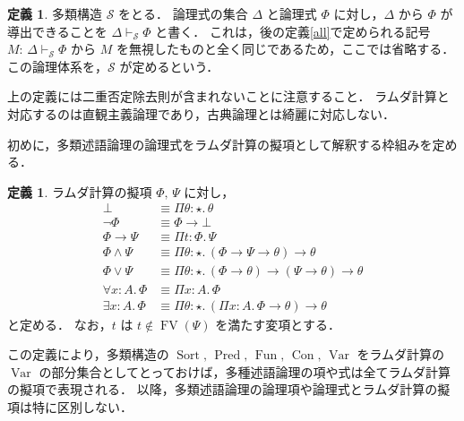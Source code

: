 \documentclass[./main]{subfiles}
\newcommand{\bto}{\mathbin{\to}}
\newcommand{\cl}{\mathpunct{:}}
\newcommand{\ocl}{\mathord{:}}
\newcommand{\op}[1]{\mathop{\mathrm{#1}}\nolimits}
\newcommand{\typstar}{\mathord{\star}}
\newcommand{\textem}[1]{\textbf{\textgt{#1}}}
\newcommand{\mathscr}[1]{\mathcal{#1}}
\newcommand{\fl}[1]{}
\newcommand{\ats}{\,}
\theoremstyle{definition}
\newtheorem{defi}[theo]{定義}
\begin{document}
\begin{defi} \label{mspl}
多類構造 $ \mathscr{S} $ をとる．
論理式の集合 $ \varDelta $ と論理式 $ \varPhi $ に対し，$ \varDelta $ から $ \varPhi $ が導出できることを $ \varDelta \vdash _{\mathscr{S}} \varPhi $ と書く．
これは，後の定義\ref{all}で定められる記号 $ M \cl\ats \varDelta \vdash _{\mathscr{S}} \varPhi $ から $ M $ を無視したものと全く同じであるため，ここでは省略する．
この論理体系を，$ \mathscr{S} $ が定める\textem{多類述語論理\fl{many sorted predicate logic}}という．
\end{defi}

上の定義には二重否定除去則が含まれないことに注意すること．
ラムダ計算と対応するのは直観主義論理であり，古典論理とは綺麗に対応しない．



初めに，多類述語論理の論理式をラムダ計算の擬項として解釈する枠組みを定める．

\begin{defi}
ラムダ計算の擬項 $ \varPhi,\ats \varPsi $ に対し，
\begin{align*}
\bot & \equiv \Pi \theta \ocl\, \typstar.\, \theta \\
\lnot \varPhi & \equiv \varPhi \bto \bot \\
\varPhi \bto \varPsi & \equiv \Pi t \ocl\, \varPhi.\, \varPsi \\
\varPhi \land \varPsi & \equiv \Pi \theta \ocl\, \typstar.\, (\varPhi \bto \varPsi \bto \theta) \bto \theta \\
\varPhi \lor \varPsi & \equiv \Pi \theta \ocl\, \typstar.\, (\varPhi \bto \theta) \bto (\varPsi \bto \theta) \bto \theta \\
\forall x \ocl\, A.\, \varPhi & \equiv \Pi x \ocl\, A.\, \varPhi \\
\exists x \ocl\, A.\, \varPhi & \equiv \Pi \theta \ocl\, \typstar.\, (\Pi x \ocl\, A.\, \varPhi \bto \theta) \bto \theta
\end{align*}
と定める．
なお，$ t $ は $ t \notin \op{FV} (\varPsi) $ を満たす変項とする．
\end{defi}

この定義により，多類構造の $ \op{Sort},\ats \op{Pred},\ats \op{Fun},\ats \op{Con},\ats \op{Var} $ をラムダ計算の $ \op{Var} $ の部分集合としてとっておけば，多種述語論理の項や式は全てラムダ計算の擬項で表現される．
以降，多類述語論理の論理項や論理式とラムダ計算の擬項は特に区別しない．

\end{document}
